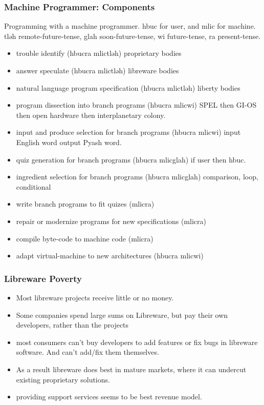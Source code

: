 \documentclass{beamer}
\begin{document}
\begin{frame}
  \frametitle{Machine Programmer: Components}
  Programming with a machine programmer.
  hbuc for user, and mlic for machine.
  tləh remote-future-tense, glah soon-future-tense, wi future-tense, 
  ra present-tense.
  \begin{itemize}
    \item trouble identify (hbucra mlictləh) proprietary bodies
    \item answer speculate (hbucra mlictləh) libreware bodies
    \item natural language program specification (hbucra mlictləh) liberty bodies
    \item program dissection into branch programs (hbucra mlicwi) SPEL then
        GI-OS then open hardware then interplanetary colony.
    \item input and produce selection for branch programs (hbucra mlicwi) input
English word output Pyash word.
    \item quiz generation for branch programs (hbucra mlicglah) if user then
hbuc.
    \item ingredient selection for  branch programs (hbucra mlicglah)
comparison, loop, conditional
    \item write branch programs to fit quizes (mlicra)
    \item repair or modernize programs for new specifications (mlicra)
    \item compile byte-code to machine code (mlicra)
    \item adapt virtual-machine to new architectures (hbucra mlicwi)
  \end{itemize}
\end{frame}

\begin{frame}
  \frametitle{Libreware Poverty}
  \begin{itemize}
    \item Most libreware projects receive little or no money.
    \item Some companies spend large sums on Libreware, but pay their own
          developers, rather than the projects
    \item most consumers can't buy developers to add features or fix bugs in
          libreware software. And can't add/fix them themselves. 
    \item As a result libreware does best in mature markets, 
          where it can undercut existing proprietary solutions. 
    \item providing support services seems to be best revenue model. 
  \end{itemize}
\end{frame}
\end{document}
